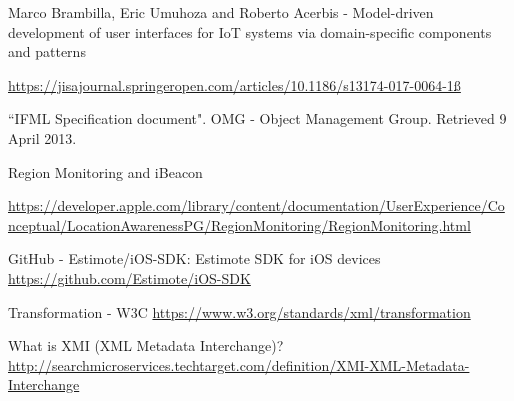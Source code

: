 

\begin{thebibliography}{90}

Marco Brambilla, Eric Umuhoza and Roberto Acerbis - Model-driven development of user interfaces for IoT systems via domain-specific components and patterns

\url{https://jisajournal.springeropen.com/articles/10.1186/s13174-017-0064-1ß}
    
``IFML Specification document". OMG - Object Management Group. Retrieved 9 April 2013.

Region Monitoring and iBeacon

\url{https://developer.apple.com/library/content/documentation/UserExperience/Conceptual/LocationAwarenessPG/RegionMonitoring/RegionMonitoring.html}
    
GitHub - Estimote/iOS-SDK: Estimote SDK for iOS devices
\url{https://github.com/Estimote/iOS-SDK}

Transformation - W3C
\url{https://www.w3.org/standards/xml/transformation}

What is XMI (XML Metadata Interchange)?
\url{http://searchmicroservices.techtarget.com/definition/XMI-XML-Metadata-Interchange}

\end{thebibliography}


